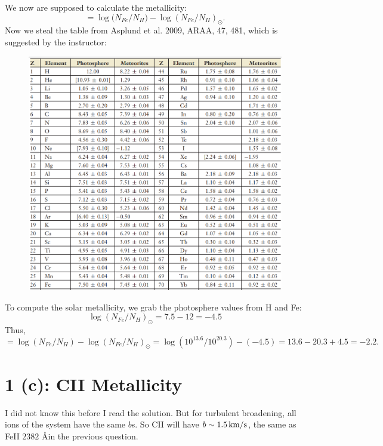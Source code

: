 \documentclass[12pt,letterpaper]{article}
\newcommand{\kms}{\textrm{\,km/s}}
\begin{document}
We now are supposed to calculate the metallicity:
\begin{equation}
    [Fe/N] = \log{(N_{Fe} / N_H}) - \log{(N_{Fe} / N_H)}_\odot.
\end{equation}
Now we steal the table from  Asplund et al. 2009,
ARAA, 47, 481, which is suggested by the instructor:
\begin{figure}[H]
    \includegraphics[width=\columnwidth]{images/photosphere.png}
\end{figure}
To compute the solar metallicity, we grab the photosphere values from H and Fe:
\begin{equation*}
    \log{(N_{Fe} / N_H)}_\odot = 7.5 - 12 = -4.5
\end{equation*}
Thus,
\begin{equation*}
    [Fe/H] = 
    \log{(N_{Fe} / N_H)} - \log{(N_{Fe} / N_H)}_\odot =
    \log{(10^{13.6} / 10^{20.3})} - (-4.5) = 
    13.6 - 20.3 + 4.5 = -2.2.
\end{equation*}

\section*{1 (c): CII Metallicity}
I did not know this before I read the solution.
But for turbulent broadening, all ions of the system have the same $b$s.
So CII will have $b \sim 1.5\kms$, the same as FeII $2382$ \AA in the previous question.
\end{document}
